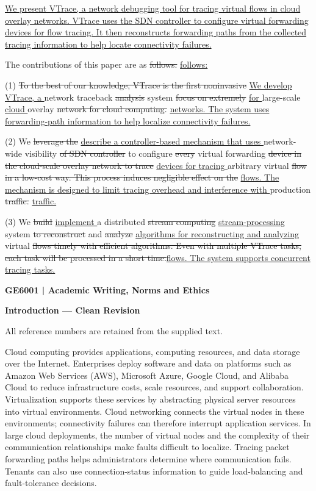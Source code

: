 \documentclass[11pt,a4paper]{article}
\newcommand{\deleted}[1]{{\color{deletion}\sout{#1}}}
\newcommand{\added}[1]{{\color{insertion}\uline{#1}}}
\newif\ifmarkedsection
\newif\ifcleansection
\begin{document}
\added{We present VTrace, a network debugging tool for tracing virtual flows in cloud overlay networks. VTrace uses the SDN controller to configure virtual forwarding devices for flow tracing. It then reconstructs forwarding paths from the collected tracing information to help locate connectivity failures.}

The contributions of this paper are as \deleted{follows. }\added{follows:}

(1) \deleted{To the best of our knowledge, VTrace is the first noninvasive }\added{We develop VTrace, a }network traceback \deleted{analysis }system \deleted{focus on extremely }\added{for }large-scale \added{cloud }overlay \deleted{network for cloud computing. }\added{networks. The system uses forwarding-path information to help localize connectivity failures.}

(2) We \deleted{leverage the }\added{describe a controller-based mechanism that uses }network-wide visibility \deleted{of SDN controller }to configure \deleted{every }virtual forwarding \deleted{device in the cloud-scale overlay network to trace }\added{devices for tracing }arbitrary virtual \deleted{flow in a low-cost way. This process induces negligible effect on the }\added{flows. The mechanism is designed to limit tracing overhead and interference with }production \deleted{traffic. }\added{traffic.}

(3) We \deleted{build }\added{implement }a distributed \deleted{stream computing }\added{stream-processing }system \deleted{to reconstruct }and \deleted{analyze }\added{algorithms for reconstructing and analyzing }virtual \deleted{flows timely with efficient algorithms. Even with multiple VTrace tasks, each task will be processed in a short time.}\added{flows. The system supports concurrent tracing tasks.}

\fi
\ifcleansection
\ifmarkedsection\clearpage\fi
{\Large\bfseries GE6001 | Academic Writing, Norms and Ethics\par}
{\large\bfseries Introduction --- Clean Revision\par}
{\small All reference numbers are retained from the supplied text.\par}

Cloud computing provides applications, computing resources, and data storage over the Internet. Enterprises deploy software and data on platforms such as Amazon Web Services (AWS), Microsoft Azure, Google Cloud, and Alibaba Cloud to reduce infrastructure costs, scale resources, and support collaboration. Virtualization supports these services by abstracting physical server resources into virtual environments. Cloud networking connects the virtual nodes in these environments; connectivity failures can therefore interrupt application services. In large cloud deployments, the number of virtual nodes and the complexity of their communication relationships make faults difficult to localize. Tracing packet forwarding paths helps administrators determine where communication fails. Tenants can also use connection-status information to guide load-balancing and fault-tolerance decisions.
\end{document}
